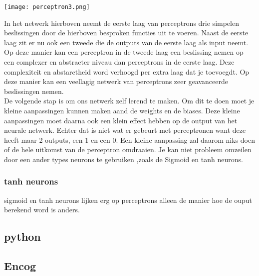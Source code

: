 \begin{center}
\texttt{[image: perceptron3.png]}
\end{center}
In het netwerk hierboven neemt de eerste laag van perceptrons drie simpelen beslissingen door de hierboven besproken functies uit te voeren. Naast de eerste laag zit er nu ook een tweede die de outputs van de eerste laag als input neemt. Op deze manier kan een perceptron in de tweede laag een beslissing nemen op een complexer en abstracter niveau dan perceptrons in de eerste laag. Deze complexiteit en abstarctheid word verhoogd per extra laag dat je toevoegdt. Op deze manier kan een veellagig netwerk van perceptrons zeer geavanceerde beslissingen nemen.\\
\newline
De volgende stap is om ons netwerk zelf lerend te maken. Om dit te doen moet je kleine aanpassingen kunnen maken aand de weights en de biases. Deze kleine aanpassingen moet daarna ook een klein effect hebben op de output van het neurale netwerk. Echter dat is niet wat er gebeurt met perceptronen want deze heeft maar 2 outputs, een 1 en een 0. Een kleine aanpassing zal daarom niks doen of de hele uitkomst van de perceptron omdraaien. Je kan niet probleem omzeilen door een ander types neurons te gebruiken ,zoals de Sigmoid en tanh neurons.

\subsubsection{tanh neurons}
sigmoid en tanh neurons lijken erg op perceptrons alleen de manier hoe de ouput berekend word is anders. 


\subsection{python}

\subsection{Encog}